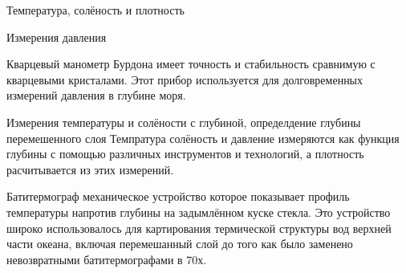 \begin{chapter}{Температура, солёность и плотность}
\begin{section}{Измерения давления}
\begin{paragraph}{Кварцевый манометр Бурдона}
имеет точность и стабильность сравнимую с кварцевыми кристалами. Этот
прибор используется для долговременных измерений давления в глубине
моря.
%
\end{paragraph}
\end{section}


\begin{section}{Измерения температуры и солёности с глубиной, определдение глубины перемешенного слоя}
Темпратура солёность и давление измеряются как функция глубины с
помощью различных инструментов и технологий, а плотность расчитывается
из этих измерений.
%

\begin{paragraph}{Батитермограф}
механическое устройство которое показывает профиль температуры
напротив глубины на задымлённом куске стекла. Это устройство широко
использовалось для картирования термической структуры вод верхней
части океана, включая перемешанный слой до того как было заменено
невозвратными батитермографами в 70х.
%
\end{paragraph}


\end{section}
\end{chapter}
